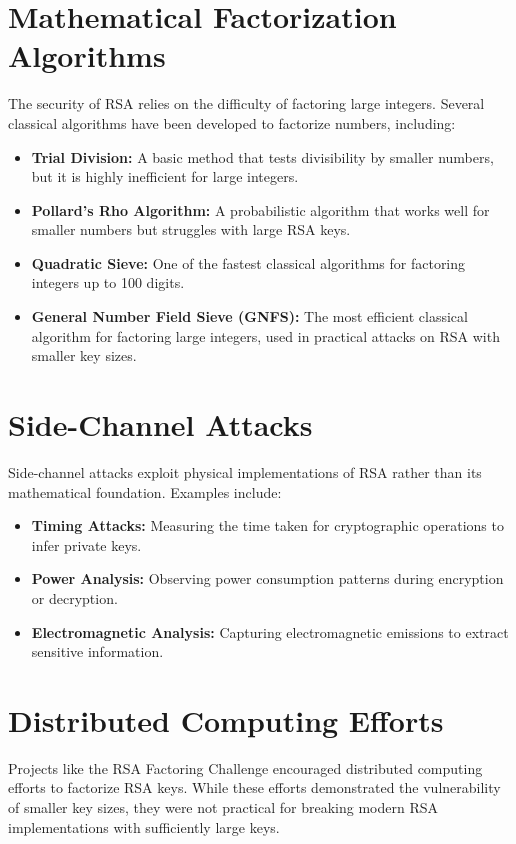 \documentclass[12pt,a4paper]{report}
\begin{document}
\section{Mathematical Factorization Algorithms}
The security of RSA relies on the difficulty of factoring large integers. Several classical algorithms have been developed to factorize numbers, including:
\begin{itemize}
    \item \textbf{Trial Division:} A basic method that tests divisibility by smaller numbers, but it is highly inefficient for large integers.
    \item \textbf{Pollard's Rho Algorithm:} A probabilistic algorithm that works well for smaller numbers but struggles with large RSA keys.
    \item \textbf{Quadratic Sieve:} One of the fastest classical algorithms for factoring integers up to 100 digits.
    \item \textbf{General Number Field Sieve (GNFS):} The most efficient classical algorithm for factoring large integers, used in practical attacks on RSA with smaller key sizes.
\end{itemize}

\section{Side-Channel Attacks}
Side-channel attacks exploit physical implementations of RSA rather than its mathematical foundation. Examples include:
\begin{itemize}
    \item \textbf{Timing Attacks:} Measuring the time taken for cryptographic operations to infer private keys.
    \item \textbf{Power Analysis:} Observing power consumption patterns during encryption or decryption.
    \item \textbf{Electromagnetic Analysis:} Capturing electromagnetic emissions to extract sensitive information.
\end{itemize}

\section{Distributed Computing Efforts}
Projects like the RSA Factoring Challenge encouraged distributed computing efforts to factorize RSA keys. While these efforts demonstrated the vulnerability of smaller key sizes, they were not practical for breaking modern RSA implementations with sufficiently large keys.
\end{document}
